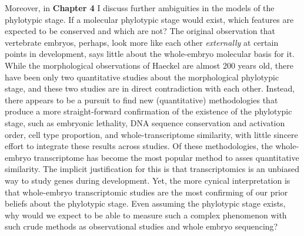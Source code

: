 Moreover, in \textbf{Chapter 4} I discuss further ambiguities in the models of the phylotypic stage. If a molecular phylotypic stage would exist, which features are expected to be conserved and which are not? The original observation that vertebrate embryos, perhaps, look more like each other \textit{externally} at certain points in development, says little about the whole-embryo molecular basis for it. While the morphological observations of Haeckel are almost 200 years old, there have been only two quantitative studies about the morphological phylotypic stage, and these two studies are in direct contradiction with each other. Instead, there appears to be a pursuit to find new (quantitative) methodologies that produce a more straight-forward confirmation of the existence of the phylotypic stage, such as embryonic lethality\cite{Uchida2018},  DNA sequence conservation\cite{Piasecka2013,Quint2012,Liu2021} and activation order\cite{Uesaka2019}, cell type proportion\cite{Mayshar2023}, and whole-transcriptome similarity\cite{Piasecka2013,Irie2011,marletaz2018,Liu2020,Leong2021,PerezPosada2022,Kalinka2010}, with little sincere effort to integrate these results across studies. Of these methodologies, the whole-embryo transcriptome has become the most popular method to asses quantitative similarity. The implicit justification for this is that transcriptomics is an unbiased way to study genes during development. Yet, the more cynical interpretation is that whole-embryo transcriptomic studies are the most confirming of our prior beliefs about the phylotypic stage. Even assuming the phylotypic stage exists, why would we expect to be able to measure such a complex phenomenon with such crude methods as observational studies and whole embryo sequencing? 

